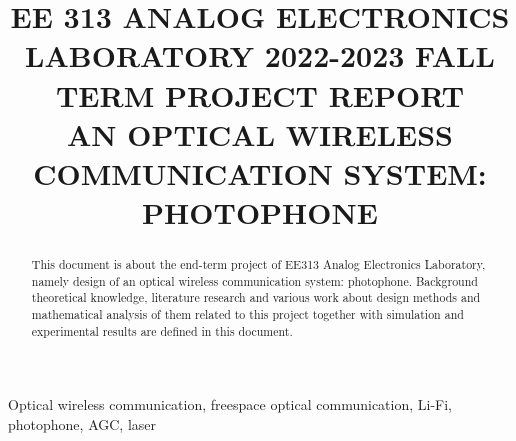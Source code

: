 \documentclass[conference]{IEEEtran}
\begin{document}
\title{EE 313 ANALOG ELECTRONICS LABORATORY 2022-2023 FALL TERM PROJECT REPORT \\ {\large AN OPTICAL WIRELESS COMMUNICATION SYSTEM: PHOTOPHONE}}

\author{
\and
{}
\and
}

\maketitle

\begin{abstract}
This document is about the end-term project of EE313 Analog Electronics Laboratory, namely design of an optical wireless communication system: photophone. Background theoretical knowledge, literature research and various work about design methods and mathematical analysis of them related to this project together with simulation and experimental results are defined in this document. \\
\end{abstract}

\begin{IEEEkeywords}
Optical wireless communication, freespace optical communication, Li-Fi, photophone, AGC, laser
\end{IEEEkeywords} 
\end{document}
